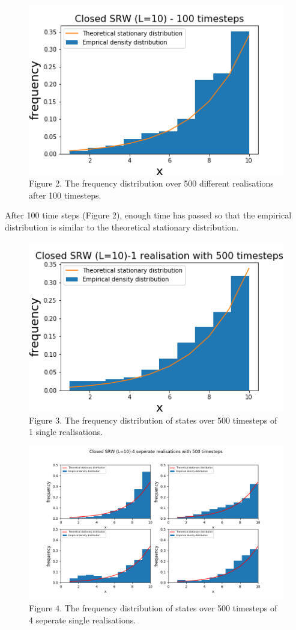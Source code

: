 \documentclass{article}
\begin{document}
\begin{figure}[H]
\includegraphics[scale=0.8]{100_steps_a.png} 
\small{Figure 2. The frequency distribution over 500 different realisations after 100 timesteps.}
\end{figure}

After 100 time steps (Figure 2), enough time has passed so that the empirical distribution is similar to the theoretical stationary distribution.


\begin{figure}[H]
\includegraphics[scale=0.8]{500_steps_a.png} 
\small{Figure 3. The frequency distribution of states over 500 timesteps of 1 single realisations. }
\end{figure}

\begin{figure}[H]
\includegraphics[scale=0.5]{500_steps_b.png} 
\small{Figure 4. The frequency distribution of states over 500 timesteps of 4 seperate single realisations. }
\end{figure}
\end{document}
